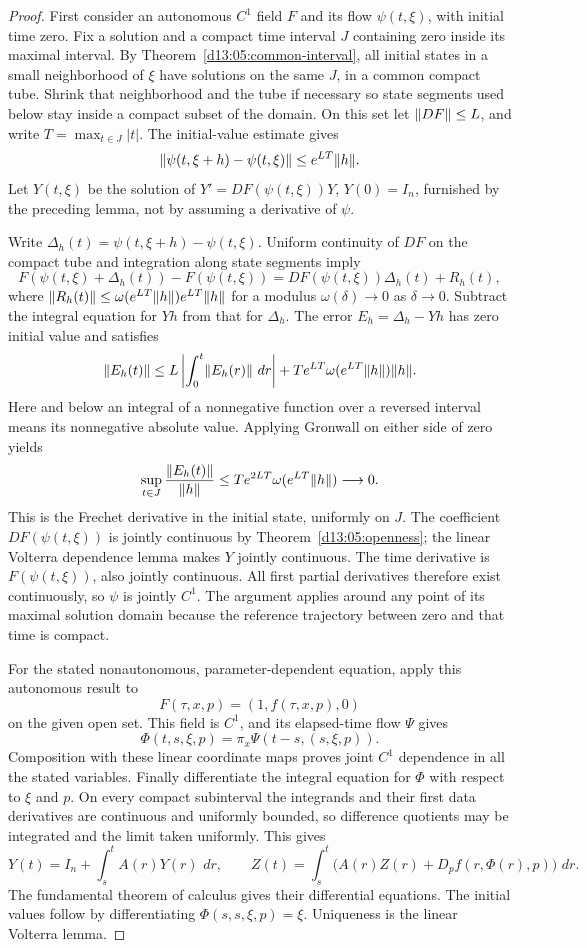 \documentclass[11pt,oneside]{book}
\theoremstyle{definition}
\theoremstyle{remark}\newtheorem{remark}[theorem]{Remark}
\newcommand{\dd}{\,d}\newcommand{\id}{\operatorname{id}}
\begin{document}
\begin{proof}
First consider an autonomous $C^1$ field $F$ and its flow
$\psi(t,\xi)$, with initial time zero. Fix a solution and a compact
time interval $J$ containing zero inside its maximal interval. By
Theorem~\ref{d13:05:common-interval}, all initial states in a small
neighborhood of $\xi$ have solutions on the same $J$, in a common
compact tube. Shrink that neighborhood and the tube if necessary so
state segments used below stay inside a compact subset of the domain.
On this set let $\lVert DF\rVert\leq L$, and write
$T=\max_{t\in J}|t|$. The initial-value estimate gives
\[
 \lVert\psi(t,\xi+h)-\psi(t,\xi)\rVert\leq e^{LT}\lVert h\rVert.
\]
Let $Y(t,\xi)$ be the solution of
$Y'=DF(\psi(t,\xi))Y$, $Y(0)=I_n$, furnished by the preceding
lemma, not by assuming a derivative of $\psi$.

Write $\Delta_h(t)=\psi(t,\xi+h)-\psi(t,\xi)$. Uniform
continuity of $DF$ on the compact tube and integration along state
segments imply
\[
 F(\psi(t,\xi)+\Delta_h(t))-F(\psi(t,\xi))
   =DF(\psi(t,\xi))\Delta_h(t)+R_h(t),
\]
where $\lVert R_h(t)\rVert\leq
\omega(e^{LT}\lVert h\rVert)e^{LT}\lVert h\rVert$ for a modulus
$\omega(\delta)\to0$ as $\delta\to0$. Subtract the integral equation
for $Yh$ from that for $\Delta_h$. The error
$E_h=\Delta_h-Yh$ has zero initial value and satisfies
\[
 \norm{E_h(t)}\leq
 L\left|\int_0^t\norm{E_h(r)}\,\dd r\right|
 +T e^{LT}\omega(e^{LT}\norm h)\norm h.
\]
Here and below an integral of a nonnegative function over a reversed
interval means its nonnegative absolute value. Applying Gronwall on
either side of zero yields
\[
 \sup_{t\in J}\frac{\lVert E_h(t)\rVert}{\lVert h\rVert}
       \leq T e^{2LT}\omega(e^{LT}\lVert h\rVert)\longrightarrow0.
\]
This is the Frechet derivative in the initial state, uniformly on $J$.
The coefficient $DF(\psi(t,\xi))$ is jointly continuous by
Theorem~\ref{d13:05:openness}; the linear Volterra dependence lemma
makes $Y$ jointly continuous. The time derivative is
$F(\psi(t,\xi))$, also jointly continuous. All first partial derivatives
therefore exist continuously, so $\psi$ is jointly $C^1$. The argument
applies around any point of its maximal solution domain because the
reference trajectory between zero and that time is compact.

For the stated nonautonomous, parameter-dependent equation, apply this
autonomous result to
\[
 F(\tau,x,p)=(1,f(\tau,x,p),0)
\]
on the given open set. This field is $C^1$, and its elapsed-time flow
$\Psi$ gives
\[
 \Phi(t,s,\xi,p)=\pi_x\Psi(t-s,(s,\xi,p)).
\]
Composition with these linear coordinate maps proves joint $C^1$
dependence in all the stated variables. Finally differentiate the
integral equation for $\Phi$ with respect to $\xi$ and $p$. On every
compact subinterval the integrands and their first data derivatives
are continuous and uniformly bounded, so difference quotients may be
integrated and the limit taken uniformly. This gives
\[
 Y(t)=I_n+\int_s^t A(r)Y(r)\,\dd r,
 \qquad Z(t)=\int_s^t\bigl(A(r)Z(r)+D_pf(r,\Phi(r),p)\bigr)\,\dd r.
\]
The fundamental theorem of calculus gives their differential equations.
The initial values follow by differentiating $\Phi(s,s,\xi,p)=\xi$.
Uniqueness is the linear Volterra lemma.
\end{proof}
\end{document}
